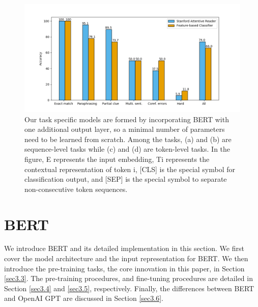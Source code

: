 \begin{figure}[htb] %
	\centering
	\includegraphics[scale=0.6]{img/cnn_analysis.png} 	%
	\caption{Our task specific models are formed by incorporating BERT with one additional output layer, so a minimal number of parameters need to be learned from scratch. Among the tasks, (a) and (b) are sequence-level tasks while (c) and (d) are token-level tasks. In the figure, E represents the input embedding, Ti represents the contextual representation of token i, [CLS] is the special symbol for classification output, and [SEP] is the special symbol to separate non-consecutive token sequences.}
	\label{fig3}
\end{figure}
	
	
	
\section {BERT} \label{sec3}
We introduce BERT and its detailed implementation in this section. We first cover the model architecture and the input representation for BERT. We then introduce the pre-training tasks, the core innovation in this paper, in Section \ref{sec3.3}. The pre-training procedures, and fine-tuning procedures are detailed in Section \ref{sec3.4} and \ref{sec3.5}, respectively. Finally, the differences between BERT and OpenAI GPT are discussed in Section \ref{sec3.6}.

